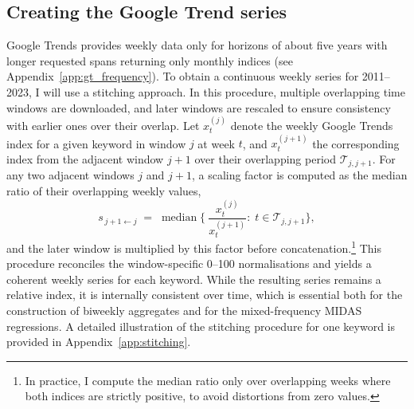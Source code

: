\documentclass[12pt,a4paper]{article}
\begin{document}
\subsection{Creating the Google Trend series}
Google Trends provides weekly data only for horizons of about five years with longer requested spans returning only monthly indices (see Appendix~\ref{app:gt_frequency}). To obtain a continuous weekly series for 2011–2023, I will use a stitching approach. In this procedure, multiple overlapping time windows are downloaded, and later windows are rescaled to ensure consistency with earlier ones over their overlap.
Let \(x_t^{(j)}\) denote the weekly Google Trends index for a given keyword in window \(j\) at week \(t\), and \(x_t^{(j+1)}\) the corresponding index from the adjacent window \(j+1\) over their overlapping period \(\mathcal{T}_{j,j+1}\). For any two adjacent windows \(j\) and \(j+1\), a scaling factor is computed as the median ratio of their overlapping weekly values,
\begin{equation}
s_{\,j{+}1 \leftarrow j}
\;=\;
\operatorname{median}
\Big\{\
\frac{x^{(j)}_{t}}{x^{(j+1)}_{t}}
:\; t \in \mathcal{T}_{j,j+1}
\Big\},
\label{eq:medianratio}
\end{equation}
and the later window is multiplied by this factor before concatenation.\footnote{In practice, I compute the median ratio only over overlapping weeks where both indices are strictly positive, to avoid distortions from zero values.}
This procedure reconciles the window-specific 0–100 normalisations and yields a coherent weekly series for each keyword. 
 While the resulting series remains a relative index, it is internally consistent over time, which is essential both for the construction of biweekly aggregates and for the mixed-frequency MIDAS regressions. A detailed illustration of the stitching procedure for one keyword is provided in Appendix~\ref{app:stitching}.
\end{document}
